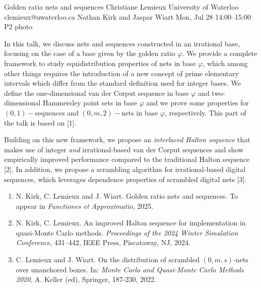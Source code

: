\clearpage
\begin{talk}
  {Golden ratio nets and sequences}%
  {Christiane Lemieux}%
  {University of Waterloo}%
  {clemieux@uwaterloo.ca}%
  {Nathan Kirk and Jaspar Wiart}%
  {}%
  {Mon, Jul 28 14:00--15:00}%
  {P2}%
  {photo}%
  
    
   

In this talk, we discuss nets and sequences constructed in an irrational base, focusing on the case of a base given by the golden ratio $\varphi$. We provide a complete framework to study equidistribution properties of nets in base $\varphi$, which among other things requires the introduction of a new concept of prime elementary intervals which differ from the standard definition used for integer bases. We define the one-dimensional van der Corput sequence in base $\varphi$ and two-dimensional Hammersley point sets in base $\varphi$ and we prove some properties for $(0,1)-$sequences and $(0,m,2)-$nets in base $\varphi$, respectively. This part of the talk is based on [1].


Building on this new framework, we propose 
an {\em interlaced Halton sequence} that makes use of integer \textit{and} irrational-based van der Corput sequences and show empirically improved performance compared to the traditional Halton sequence [2]. In addition, we propose a scrambling algorithm for irrational-based digital sequences, which leverages dependence properties of scrambled digital nets [3].

\medskip

\begin{enumerate}
 \item[{[1]}] N. Kirk, C. Lemieux and J. Wiart. Golden ratio nets and sequences. To appear in {\em Functiones et Approximatio}, 2025.
 \item[{[2]}] N. Kirk, C. Lemieux. An improved Halton sequence for implementation in quasi-Monte Carlo methods. {\em Proceedings of the 2024 Winter Simulation Conference}, 431--442, IEEE Press, Piscataway, NJ, 2024. 
    \item[{[3]}] C. Lemieux and J. Wiart. On the distribution of scrambled $(0, m, s)$-nets over unanchored
boxes. In: {\em Monte Carlo and Quasi-Monte Carlo Methods 2020}, A. Keller (ed), 
Springer, 187-230, 2022.
\end{enumerate}

\end{talk}

